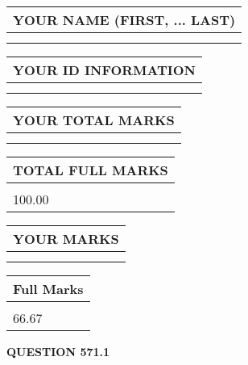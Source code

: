 \documentclass{ctexart}
\begin{document}
   
   
   
\newpage 
\setcounter{page}{ 
   571001 } 
   
   
   
   
\noindent\begin{tabular}{|l|}
\hline
YOUR NAME (FIRST, ... LAST)  \\
\hline
 \\ 
 \\ 
\hline
\end{tabular}
\hspace{0.05in} \begin{tabular}{|l|}
\hline
 YOUR   ID   INFORMATION  \\
\hline
 \\ 
 \\ 
\hline
\end{tabular}
   
   
\vspace{0.2in}\noindent\begin{tabular}{|l|}
\hline
YOUR TOTAL MARKS  \\
\hline
 \\ 
 \\ 
\hline
\end{tabular}
\hspace{0.05in} \begin{tabular}{|l|}
\hline
TOTAL FULL MARKS  \\
\hline
 \\ 
100.00 \\
\hline
\end{tabular}
   
   
 \vspace{0.2in}
 
 
 
 
   
   
  
\vspace{0.2in}
  
\noindent\begin{tabular}{|l|}
\hline
 YOUR MARKS  \\
\hline
 \\ 
 \\ 
\hline
\end{tabular}
\hspace{0.05in} \begin{tabular}{|l|}
\hline
 Full Marks  \\
\hline
 \\ 
66.67 \\
\hline
\end{tabular}
{\textbf{\Large{QUESTION
571.1 
}}}
  
\end{document}
